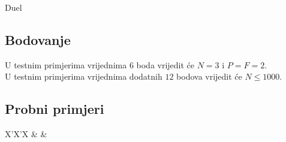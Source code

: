 \begin{statement}[
  problempoints=30,
  timelimit=1 sekunda,
  memorylimit=512 MiB,
]{Duel}
\subsection*{Bodovanje}
U testnim primjerima vrijednima $6$ boda vrijedit će $N = 3$ i $P = F = 2$. \\
U testnim primjerima vrijednima dodatnih $12$ bodova vrijedit će $N \le 1000$.

\subsection*{Probni primjeri}
\begin{tabularx}{\textwidth}{X'X'X}
 &
 &
\end{tabularx}

\end{statement}

